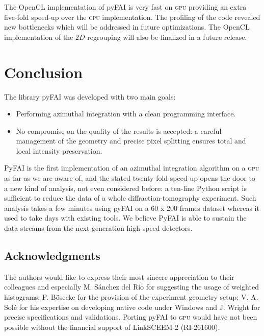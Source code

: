 \documentclass[a4paper]{jpconf}
\begin{document}
The OpenCL implementation of pyFAI is very fast on \textsc{gpu} providing an
extra five-fold speed-up over the \textsc{cpu} implementation. The
profiling of the code revealed new bottlenecks which will be addressed in future
optimizations. The OpenCL implementation of the $2D$ regrouping will also be
finalized in a future release.

\section{Conclusion}
The library pyFAI was developed with two main goals:
\begin{itemize}
\item Performing azimuthal integration with a clean programming interface.
\item No compromise on the quality of the results is accepted: a careful
management of the geometry and precise pixel splitting ensures total and
local intensity preservation.
\end{itemize}
PyFAI is the first implementation of an azimuthal integration algorithm on
a \textsc{gpu} as far as we are aware of, and the stated twenty-fold speed up
opens the door to a new kind of analysis, not even considered before:
a ten-line Python script is sufficient to reduce the data of a whole
diffraction-tomography experiment. Such analysis takes a few minutes using
pyFAI on a 60 x 200 frames dataset whereas it used to take days with existing
tools.
We believe PyFAI is able to sustain the data streams from the next generation
high-speed detectors.

\subsection*{Acknowledgments}
The authors would like to express their most sincere appreciation to their
colleagues and especially M. S\'anchez del R\'io for suggesting
the usage of weighted histograms; P. B\"osecke for the provision of the
experiment geometry setup; V. A. Sol\'e for his expertise on developing  native 
code under Windows and J. Wright for precise specifications and validations.
Porting pyFAI to \textsc{gpu} would have not been possible without the financial
support of LinkSCEEM-2 (RI-261600).
\end{document}
